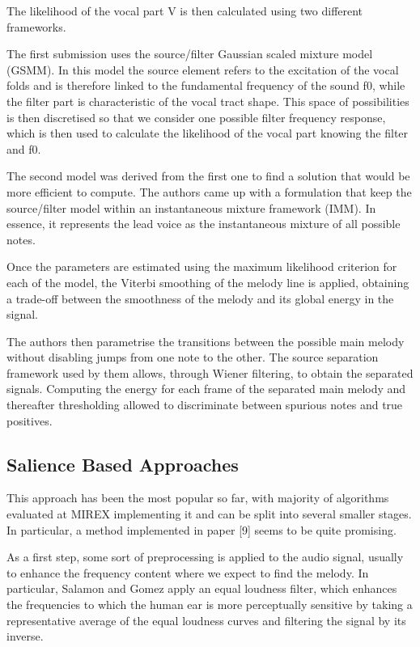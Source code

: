 The likelihood of the vocal part V is then calculated using two different frameworks.

The first submission uses the source/filter Gaussian scaled mixture model (GSMM). In this model the source element refers to the excitation of the vocal folds and is therefore linked to the fundamental frequency of the sound f0, while the filter part is characteristic of the vocal tract shape. This space of possibilities is then discretised so that we consider one possible filter frequency response, which is then used to calculate the likelihood of the vocal part knowing the filter and f0.

The second model was derived from the first one to find a solution that would be more efficient to compute. The authors came up with a formulation that keep the source/filter model within an instantaneous mixture framework (IMM). In essence, it represents the lead voice as the instantaneous mixture of all possible notes.


Once the parameters are estimated using the maximum likelihood criterion for each of the model, the Viterbi smoothing of the melody line is applied, obtaining a trade-off between the smoothness of the melody and its global energy in the signal.
 
The authors then parametrise the transitions between the possible main melody without disabling jumps from one note to the other. The source separation framework used by them allows, through Wiener filtering, to obtain the separated signals. Computing the energy for each frame of the separated main melody and thereafter thresholding allowed to discriminate between spurious notes and true positives.


\subsection{Salience Based Approaches}

This approach has been the most popular so far, with majority of algorithms evaluated at MIREX implementing it and can be split into several smaller stages. In particular, a method implemented in paper [9] seems to be quite promising.

As a first step, some sort of preprocessing is applied to the audio signal, usually to enhance the frequency content where we expect to find the melody. In particular, Salamon and Gomez apply an equal loudness filter, which enhances the frequencies to which the human ear is more perceptually sensitive by taking a representative average of the equal loudness curves and filtering the signal by its inverse. 

